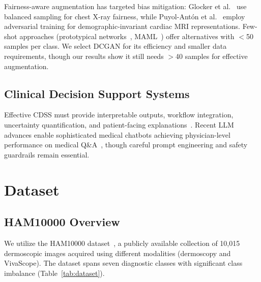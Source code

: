 \documentclass[10pt, twocolumn, letterpaper]{article}
\begin{document}
Fairness-aware augmentation has targeted bias mitigation: Glocker et al.~\cite{glocker2023} use balanced sampling for chest X-ray fairness, while Puyol-Antón et al.~\cite{puyol2021} employ adversarial training for demographic-invariant cardiac MRI representations. Few-shot approaches (prototypical networks~\cite{snell2017}, MAML~\cite{finn2017}) offer alternatives with $<$50 samples per class. We select DCGAN for its efficiency and smaller data requirements, though our results show it still needs $>$40 samples for effective augmentation.

\subsection{Clinical Decision Support Systems}
Effective CDSS must provide interpretable outputs, workflow integration, uncertainty quantification, and patient-facing explanations~\cite{sutton2020}. Recent LLM advances enable sophisticated medical chatbots achieving physician-level performance on medical Q\&A~\cite{singhal2023}, though careful prompt engineering and safety guardrails remain essential.

\section{Dataset}

\subsection{HAM10000 Overview}
We utilize the HAM10000 dataset~\cite{tschandl2018}, a publicly available collection of 10,015 dermoscopic images acquired using different modalities (dermoscopy and VivaScope). The dataset spans seven diagnostic classes with significant class imbalance (Table~\ref{tab:dataset}).

\begin{table}[h]
\centering
\caption{HAM10000 Class Distribution and Clinical Significance}
\label{tab:dataset}
\vspace{0.2cm}
\end{table}
\end{document}
